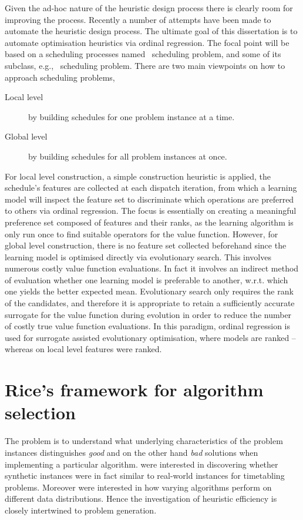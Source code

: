 Given the ad-hoc nature of the heuristic design process there is clearly room for improving the process. Recently a number of attempts have been made to automate the heuristic design process. 
The ultimate goal of this dissertation is to automate optimisation heuristics via ordinal regression. 
The focal point will be based on a scheduling processes named \jsp\ scheduling problem, and some of its subclass, e.g., \fsp\ scheduling problem.
There are two main viewpoints on how to approach scheduling problems,
\begin{description}
\item[Local level] by building schedules for one problem instance at a time.
\item[Global level] by building schedules for all problem instances at once.
\end{description}
For local level construction, a simple construction heuristic is applied, the schedule's features are collected at each dispatch iteration, from which a learning model will inspect the feature set to discriminate which operations are preferred to others via ordinal regression. The focus is essentially on creating a meaningful preference set composed of features and their ranks, as the learning algorithm is only run once to find suitable operators for the value function. 
However, for global level construction, there is no feature set collected beforehand since the learning model is optimised directly via evolutionary search. This involves numerous costly value function evaluations. In fact it involves an indirect method of evaluation whether one learning model is preferable to another, w.r.t. which one yields the better expected mean. 
Evolutionary search only requires the rank of the candidates, and therefore it is appropriate to retain a sufficiently accurate surrogate for the value function during evolution in order to reduce the number of costly true value function evaluations. In this paradigm, ordinal regression is used for surrogate assisted evolutionary optimisation, where models are ranked -- whereas on local level features were ranked. 

\section{Rice's framework for algorithm selection}\label{sec:rice}
The problem is to understand what underlying characteristics of the problem instances distinguishes \emph{good} and on the other hand \emph{bad} solutions when implementing a particular algorithm. \citet{SmithMilesLion5} were interested in discovering whether synthetic instances were in fact similar to real-world instances for timetabling problems. Moreover \citeauthor{SmithMilesLion5} were interested in how varying algorithms perform on different data distributions. Hence the investigation of heuristic efficiency is closely intertwined to problem generation. 


